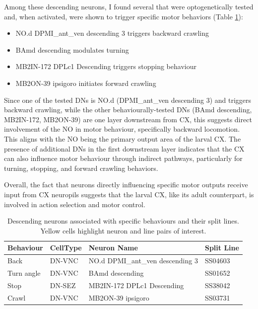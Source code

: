    Among these descending neurons, I found several that were optogenetically tested and, when activated, were shown to trigger specific motor behaviors (Table \ref{behaviourCXdescending}): 
    \begin{itemize}
        \item NO.d DPMI\_ant\_ven descending 3 triggers backward crawling
        \item BAmd descending modulates turning
        \item MB2IN-172 DPLc1 Descending triggers stopping behaviour
        \item MB2ON-39 ipsigoro initiates forward crawling
    \end{itemize}

    Since one of the tested DNs is NO.d (DPMI\_ant\_ven descending 3) and triggers backward crawling, while the other behaviourally-tested DNs (BAmd descending, MB2IN-172, MB2ON-39) are one layer downstream from CX, this suggests direct involvement of the NO in motor behaviour, specifically backward locomotion. This aligns with the NO being the primary output area of the larval CX. The presence of additional DNs in the first downstream layer indicates that the CX can also influence motor behaviour through indirect pathways, particularly for turning, stopping, and forward crawling behaviors.

    Overall, the fact that neurons directly influencing specific motor outputs receive input from CX neuropils suggests that the larval CX, like its adult counterpart, is involved in action selection and motor control.

    \begin{table}[H]
        \centering
        \begin{tabular}{l l p{} l}
            \toprule
            \textbf{Behaviour} & \textbf{CellType} & \textbf{Neuron Name} & \textbf{Split Line} \\
            \midrule
            Back & DN-VNC & \cellcolor{cxhl} NO.d DPMI\_ant\_ven descending 3 & \cellcolor{cxhl} SS04603 \\
            Turn angle & DN-VNC & \cellcolor{cxhl} BAmd descending & \cellcolor{cxhl} SS01652 \\
            Stop & DN-SEZ & \cellcolor{cxhl} MB2IN-172 DPLc1 Descending & \cellcolor{cxhl} SS38042 \\
            Crawl & DN-VNC & \cellcolor{cxhl} MB2ON-39 ipsigoro & \cellcolor{cxhl} SS03731 \\
            \bottomrule
        \end{tabular}
        \caption[Behaviour of CX Descending Neurons]{Descending neurons associated with specific behaviours and their split lines. Yellow cells highlight neuron and line pairs of interest.}
        \label{behaviourCXdescending}
    \end{table}


